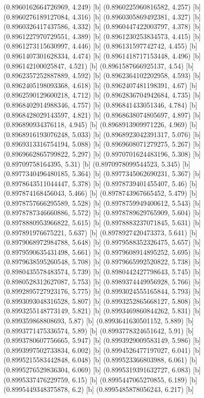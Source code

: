 {{{(0.8960162664726969, 4.249) [b] 
(0.8960225960816582, 4.257) [b] 
(0.8960276189127084, 4.316) [b] 
(0.8960305869492381, 4.327) [b] 
(0.8960326417437586, 4.332) [b] 
(0.8960447422003797, 4.378) [b] 
(0.8961227970729551, 4.389) [b] 
(0.8961230253834573, 4.415) [b] 
(0.8961273115630997, 4.446) [b] 
(0.896131597742742, 4.455) [b] 
(0.8961407301628334, 4.474) [b] 
(0.8961418717153448, 4.496) [b] 
(0.896142100025847, 4.521) [b] 
(0.8961587666925137, 4.54) [b] 
(0.8962357252887889, 4.592) [b] 
(0.8962364102202958, 4.593) [b] 
(0.8962405198093368, 4.618) [b] 
(0.8962407481198391, 4.67) [b] 
(0.8962590129600218, 4.712) [b] 
(0.8962836704942684, 4.735) [b] 
(0.8968402914988346, 4.757) [b] 
(0.896841433051346, 4.784) [b] 
(0.8968428029143597, 4.821) [b] 
(0.8968638074805697, 4.897) [b] 
(0.896890934376118, 4.945) [b] 
(0.8968913909971226, 4.969) [b] 
(0.8968916193076248, 5.033) [b] 
(0.8968923042391317, 5.076) [b] 
(0.8969313316754194, 5.088) [b] 
(0.8969608071279275, 5.267) [b] 
(0.8969662865799822, 5.297) [b] 
(0.8970701624483196, 5.308) [b] 
(0.89709758164395, 5.31) [b] 
(0.8970978099544523, 5.345) [b] 
(0.8977340496480185, 5.364) [b] 
(0.8977345062690231, 5.367) [b] 
(0.8978643511044447, 5.378) [b] 
(0.8978739401455407, 5.46) [b] 
(0.897874168456043, 5.466) [b] 
(0.8978743967665452, 5.479) [b] 
(0.8978757666295589, 5.528) [b] 
(0.8978759949400612, 5.543) [b] 
(0.8978787346660886, 5.572) [b] 
(0.8978789629765909, 5.604) [b] 
(0.8978880953966822, 5.615) [b] 
(0.8978883237071845, 5.631) [b] 
(0.897891976675221, 5.637) [b] 
(0.8978927420473373, 5.641) [b] 
(0.8979068972984788, 5.648) [b] 
(0.8979588352326475, 5.657) [b] 
(0.8979590635431498, 5.661) [b] 
(0.8979608914895252, 5.695) [b] 
(0.8979638595260548, 5.708) [b] 
(0.8979665992520822, 5.738) [b] 
(0.8980435578483574, 5.739) [b] 
(0.8980442427798643, 5.745) [b] 
(0.8980528312627087, 5.753) [b] 
(0.8989374449956928, 5.766) [b] 
(0.8992895727923176, 5.775) [b] 
(0.8993024555165844, 5.793) [b] 
(0.8993093048316528, 5.807) [b] 
(0.8993252865668127, 5.808) [b] 
(0.8993255148773149, 5.821) [b] 
(0.8993469860844262, 5.831) [b] 
(0.899359868808693, 5.87) [b] 
(0.8993641630501152, 5.889) [b] 
(0.8993771475336574, 5.89) [b] 
(0.8993778324651642, 5.91) [b] 
(0.8993780607756665, 5.947) [b] 
(0.8993929009583149, 5.986) [b] 
(0.8993997502733834, 6.002) [b] 
(0.8994526477197027, 6.041) [b] 
(0.8995215583442848, 6.048) [b] 
(0.899523366803988, 6.061) [b] 
(0.8995276529836304, 6.069) [b] 
(0.8995319391632727, 6.083) [b] 
(0.8995337476229759, 6.15) [b] 
(0.8995447065270855, 6.189) [b] 
(0.8995449348375878, 6.2) [b] 
(0.8995485878056243, 6.217) [b] 
}}}
